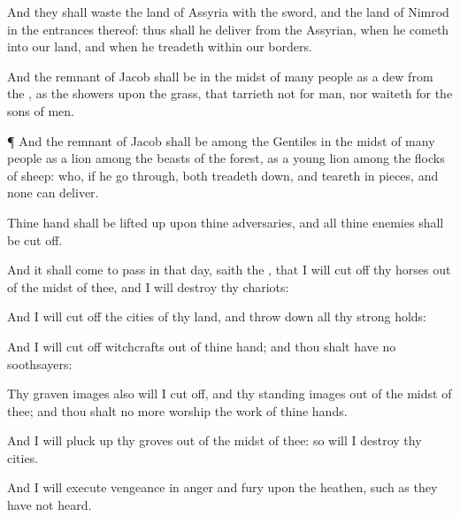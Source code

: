 {And they shall
waste the
land of
Assyria with the
sword, and the
land of
Nimrod in the
entrances thereof: thus shall he
deliver
{} from the
Assyrian, when he
cometh into our
land, and when he
treadeth within our
borders.


\par }{\PP {}And the
remnant of
Jacob shall be in the
midst of
many
people as a
dew from the
{}, as the
showers upon the
grass, that
tarrieth not for
man, nor
waiteth for the
sons of
men.


\par }{\PP {}¶ And the
remnant of
Jacob shall be among the
Gentiles in the
midst of
many
people as a
lion among the
beasts of the
forest, as a young
lion among the
flocks of
sheep: who, if he go
through, both treadeth
down, and teareth in
pieces, and none can
deliver.

Thine
hand shall be lifted
up upon thine
adversaries, and all thine
enemies shall be cut
off.

And it shall come to pass in that
day,
saith the
{}, that I will cut
off thy
horses out of the
midst of thee, and I will
destroy thy
chariots:

And I will cut
off the
cities of thy
land, and throw
down all thy strong
holds:

And I will cut
off
witchcrafts out of thine
hand; and thou shalt have no
{}
soothsayers:

Thy graven
images also will I cut
off, and thy standing
images out of the
midst of thee; and thou shalt no more
worship the
work of thine
hands.

And I will pluck
up thy
groves out of the
midst of thee: so will I
destroy thy
cities.

And I will
execute
vengeance in
anger and
fury upon the
heathen, such as they have not
heard.




\par }
